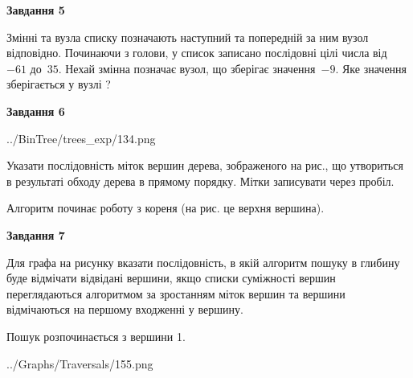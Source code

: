 \documentclass[12pt, ukrainian]{article}
\begin{document}
{\begin {large}
{\begin {center}\textbf{Завдання 5}\end {center}}\par
Змінні  та  вузла списку позначають наступний та попередній за ним вузол відповідно. Починаючи з голови, у список записано послідовні цілі числа від~$-61$ до~$35$. Нехай змінна  позначає вузол, що зберігає значення~$-9$.
Яке значення зберігається у вузлі  ?\par
\newpage

{\begin {center}\textbf{Завдання 6}\end {center}}\par

\begin{center}
	{../BinTree/trees_exp/134.png}
\end{center}
Указати послідовність міток вершин дерева, зображеного на рис., що утвориться в результаті обходу дерева в прямому порядку. Мітки записувати через пробіл.\par Алгоритм починає роботу з кореня (на рис. це верхня вершина).\par
\newpage

{\begin {center}\textbf{Завдання 7}\end {center}}\par
Для графа на рисунку вказати послідовність, в якій алгоритм пошуку в глибину буде відмічати відвідані вершини, якщо списки суміжності вершин переглядаються алгоритмом за зростанням міток вершин та вершини відмічаються на першому вход\-женні у вершину.\par
Пошук розпочинається з вершини 1.\par

\begin{center}
	{../Graphs/Traversals/155.png}
\end{center}\par
\newpage


\end{large}}
\end{document}
